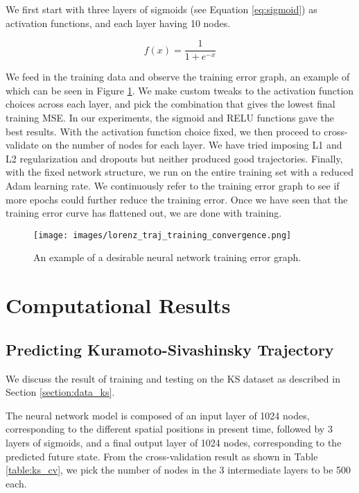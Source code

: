 \documentclass[letterpaper, 10 pt, conference]{ieeeconf}  %
\begin{document}
We first start with three layers of sigmoids (see Equation \ref{eq:sigmoid}) as activation functions, and each layer having 10 nodes.

\begin{equation}
\label{eq:sigmoid}
f(x) = \frac{1}{1 + e ^{-x}}
\end{equation}

We feed in the training data and observe the training error graph, an example of which can be seen in Figure \ref{fig:lorenz_traj_training_convergence}. We make custom tweaks to the activation function choices across each layer, and pick the combination that gives the lowest final training MSE. In our experiments, the sigmoid and RELU functions gave the best results. With the activation function choice fixed, we then proceed to cross-validate on the number of nodes for each layer. We have tried imposing L1 and L2 regularization and dropouts but neither produced good trajectories. Finally, with the fixed network structure, we run on the entire training set with a reduced Adam learning rate. We continuously refer to the training error graph to see if more epochs could further reduce the training error. Once we have seen that the training error curve has flattened out, we are done with training.

\begin{figure}[htb]
\centering
\texttt{[image: images/lorenz\_traj\_training\_convergence.png]}
\caption{An example of a desirable neural network training error graph.}
\label{fig:lorenz_traj_training_convergence}
\end{figure}


\section{Computational Results}
\subsection{Predicting Kuramoto-Sivashinsky Trajectory}
We discuss the result of training and testing on the KS dataset as described in Section \ref{section:data_ks}.

The neural network model is composed of an input layer of 1024 nodes, corresponding to the different spatial positions in present time, followed by 3 layers of sigmoids, and a final output layer of 1024 nodes, corresponding to the predicted future state. From the cross-validation result as shown in Table \ref{table:ks_cv}, we pick the number of nodes in the 3 intermediate layers to be 500 each.
\end{document}

